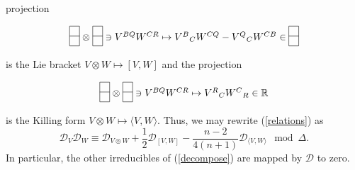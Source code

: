 \documentclass[a4paper,12pt]{amsart}
\newcommand{\topten}{\circledcirc}
\begin{document}
projection
$$\begin{picture}(10,30)
\put(0,5){\line(1,0){10}}
\put(0,15){\line(1,0){10}}
\put(0,25){\line(1,0){10}}
\put(0,5){\line(0,1){20}}
\put(10,5){\line(0,1){20}}
\end{picture}
\raisebox{11pt}{$\;\otimes\;$}
\begin{picture}(10,30)
\put(0,5){\line(1,0){10}}
\put(0,15){\line(1,0){10}}
\put(0,25){\line(1,0){10}}
\put(0,5){\line(0,1){20}}
\put(10,5){\line(0,1){20}}
\end{picture}
\raisebox{11pt}{$\;\ni V^{BQ}W^{CR}\mapsto V^B{}_CW^{CQ}-V^Q{}_CW^{CB}\in\;$}
\begin{picture}(10,30)
\put(0,5){\line(1,0){10}}
\put(0,15){\line(1,0){10}}
\put(0,25){\line(1,0){10}}
\put(0,5){\line(0,1){20}}
\put(10,5){\line(0,1){20}}
\end{picture}$$
is the Lie bracket $V\otimes W\mapsto[V,W]$ and the projection
$$\begin{picture}(10,30)
\put(0,5){\line(1,0){10}}
\put(0,15){\line(1,0){10}}
\put(0,25){\line(1,0){10}}
\put(0,5){\line(0,1){20}}
\put(10,5){\line(0,1){20}}
\end{picture}
\raisebox{11pt}{$\;\otimes\;$}
\begin{picture}(10,30)
\put(0,5){\line(1,0){10}}
\put(0,15){\line(1,0){10}}
\put(0,25){\line(1,0){10}}
\put(0,5){\line(0,1){20}}
\put(10,5){\line(0,1){20}}
\end{picture}
\raisebox{11pt}{$\;\ni V^{BQ}W^{CR}\mapsto V^R{}_CW^C{}_R\in{\mathbb R}$}$$
is the Killing form $V\otimes W\mapsto\langle V,W\rangle$. Thus, we may rewrite
(\ref{relations}) as
\begin{equation}\label{identity}
{\mathcal D}_V{\mathcal D}_W\equiv{\mathcal D}_{V\topten W}
+\frac{1}{2}{\mathcal D}_{[V,W]}
-\frac{n-2}{4(n+1)}{\mathcal D}_{\langle V,W\rangle}\mod\Delta.\end{equation}
In particular, the other irreducibles of (\ref{decompose}) are mapped by
${\mathcal D}$ to zero.
\end{document}
